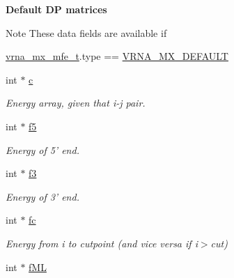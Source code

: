 \begin{Indent}{\bf Default D\+P matrices}\par
{\em \begin{DoxyNote}{Note}
These data fields are available if 
\begin{DoxyCode}
\hyperlink{group__dp__matrices_structvrna__mx__mfe__s}{vrna\_mx\_mfe\_t}.type == \hyperlink{group__dp__matrices_gga6042ea1d58d01931e959791be6d89343aafa2568956dab79595521e20c49a5f75}{VRNA\_MX\_DEFAULT} 
\end{DoxyCode}
 
\end{DoxyNote}
}\begin{DoxyCompactItemize}
\item 
\hypertarget{group__dp__matrices_a60a511fd42905ee4f046c56a76865bf9}{int $\ast$ \hyperlink{group__dp__matrices_a60a511fd42905ee4f046c56a76865bf9}{c}}\label{group__dp__matrices_a60a511fd42905ee4f046c56a76865bf9}

\begin{DoxyCompactList}\small\item\em Energy array, given that i-\/j pair. \end{DoxyCompactList}\item 
\hypertarget{group__dp__matrices_abebad693be987c2701d64477ab858039}{int $\ast$ \hyperlink{group__dp__matrices_abebad693be987c2701d64477ab858039}{f5}}\label{group__dp__matrices_abebad693be987c2701d64477ab858039}

\begin{DoxyCompactList}\small\item\em Energy of 5' end. \end{DoxyCompactList}\item 
\hypertarget{group__dp__matrices_a4ea4595a93733adef047ece8e6f5da52}{int $\ast$ \hyperlink{group__dp__matrices_a4ea4595a93733adef047ece8e6f5da52}{f3}}\label{group__dp__matrices_a4ea4595a93733adef047ece8e6f5da52}

\begin{DoxyCompactList}\small\item\em Energy of 3' end. \end{DoxyCompactList}\item 
\hypertarget{group__dp__matrices_a8ee6b6cefe20cfbf1f6bef5c788b6667}{int $\ast$ \hyperlink{group__dp__matrices_a8ee6b6cefe20cfbf1f6bef5c788b6667}{fc}}\label{group__dp__matrices_a8ee6b6cefe20cfbf1f6bef5c788b6667}

\begin{DoxyCompactList}\small\item\em Energy from i to cutpoint (and vice versa if i$>$cut) \end{DoxyCompactList}\item 
\hypertarget{group__dp__matrices_a103995e4ab8e21e7f8bc36a6edcb1331}{int $\ast$ \hyperlink{group__dp__matrices_a103995e4ab8e21e7f8bc36a6edcb1331}{f\+M\+L}}\label{group__dp__matrices_a103995e4ab8e21e7f8bc36a6edcb1331}


\end{DoxyCompactItemize}
\end{Indent}
